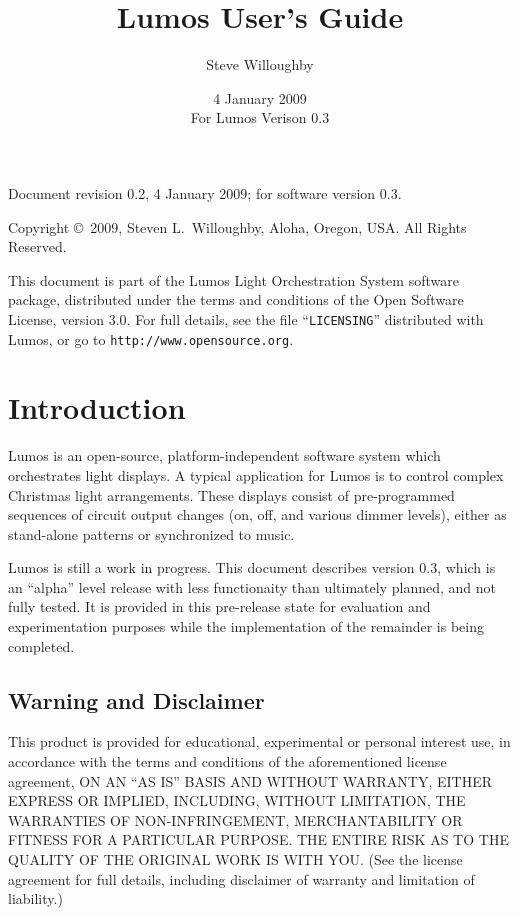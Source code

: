 \documentclass{article}
\begin{document}
\title{Lumos User's Guide}
\author{Steve Willoughby}
\date{4 January 2009 \\ For Lumos Verison 0.3}
\maketitle
\tableofcontents
\pagebreak
\vfill
\begin{flushleft}
Document revision 0.2, 4 January 2009;
for software version 0.3.

Copyright \copyright\ 2009, Steven L.\ Willoughby,
Aloha, Oregon, USA.  All Rights Reserved.

This document is part of the Lumos Light Orchestration System software package, distributed under the terms and conditions of the Open Software License, version 3.0.  For full details, see the file ``{\tt LICENSING}'' distributed with Lumos, or go to {\tt http://www.opensource.org}.
\end{flushleft}
\pagebreak

\section{Introduction}
Lumos is an open-source, platform-independent software system which
orchestrates light displays.  A typical application for Lumos is to control
complex Christmas light arrangements.  These displays consist of
pre-programmed sequences of circuit output changes (on, off, and various
dimmer levels), either as stand-alone patterns or synchronized to music.

Lumos is still a work in progress.  This document describes version 0.3, which
is an ``alpha'' level release with less functionaity than ultimately planned,
and not fully tested.  It is provided in this pre-release state for evaluation 
and experimentation purposes while the implementation of the remainder is 
being completed.

\subsection{Warning and Disclaimer}
This product is provided for educational, experimental or personal
interest use, in accordance with the terms and conditions of the
aforementioned license agreement, ON AN ``AS IS'' BASIS AND WITHOUT
WARRANTY, EITHER EXPRESS OR IMPLIED, INCLUDING, WITHOUT LIMITATION,
THE WARRANTIES OF NON-INFRINGEMENT, MERCHANTABILITY OR FITNESS FOR A
PARTICULAR PURPOSE. THE ENTIRE RISK AS TO THE QUALITY OF THE ORIGINAL
WORK IS WITH YOU.  (See the license agreement for full details, 
including disclaimer of warranty and limitation of liability.)
\end{document}
